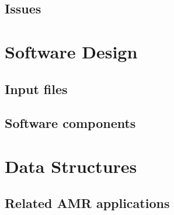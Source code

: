 \documentclass{beamer}
\begin{document}



\subsection{Issues}



\section{Software Design}

\subsection{Input files}






\subsection{Software components}


% 
% 
% 
% 
% 

\section{Data Structures}

\subsection{Related AMR applications}
\end{document}
